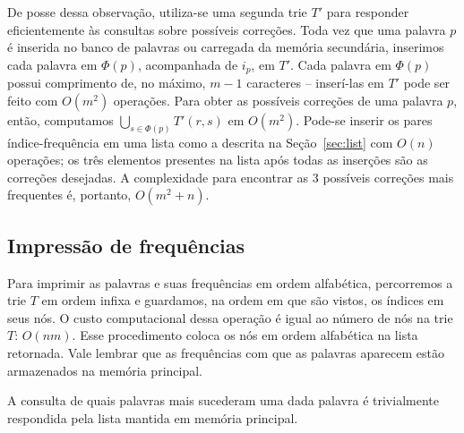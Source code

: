 \documentclass[12pt]{article}
\begin{document}
    De posse dessa observação, utiliza-se uma segunda trie $T'$ para responder eficientemente às consultas sobre possíveis correções.
    Toda vez que uma palavra $p$ é inserida no banco de palavras ou carregada da memória secundária, inserimos cada palavra em $\Phi(p)$, acompanhada de $i_p$, em $T'$.
    Cada palavra em $\Phi(p)$ possui comprimento de, no máximo, $m - 1$ caracteres -- inserí-las em $T'$ pode ser feito com $O(m^2)$ operações.
    Para obter as possíveis correções de uma palavra $p$, então, computamos $\bigcup_{s \in \Phi(p)} T'(r, s)$ em $O(m^2)$.
    Pode-se inserir os pares índice-frequência em uma lista como a descrita na Seção~\ref{sec:list} com $O(n)$ operações; os três elementos presentes na lista após todas as inserções são as correções desejadas.
    A complexidade para encontrar as 3 possíveis correções mais frequentes é, portanto, $O(m^2 + n)$.

    \subsection{Impressão de frequências}
    Para imprimir as palavras e suas frequências em ordem alfabética, percorremos a trie $T$ em ordem infixa e guardamos, na ordem em que são vistos, os índices em seus nós.
    O custo computacional dessa operação é igual ao número de nós na trie $T$: $O(nm)$.
    Esse procedimento coloca os nós em ordem alfabética na lista retornada. 
    Vale lembrar que as frequências com que as palavras aparecem estão armazenados na memória principal.

    A consulta de quais palavras mais sucederam uma dada palavra é trivialmente respondida pela lista mantida em memória principal.
\end{document}
